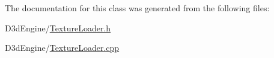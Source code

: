The documentation for this class was generated from the following files\+:\begin{DoxyCompactItemize}
\item 
D3d\+Engine/\mbox{\hyperlink{_texture_loader_8h}{Texture\+Loader.\+h}}\item 
D3d\+Engine/\mbox{\hyperlink{_texture_loader_8cpp}{Texture\+Loader.\+cpp}}\end{DoxyCompactItemize}
